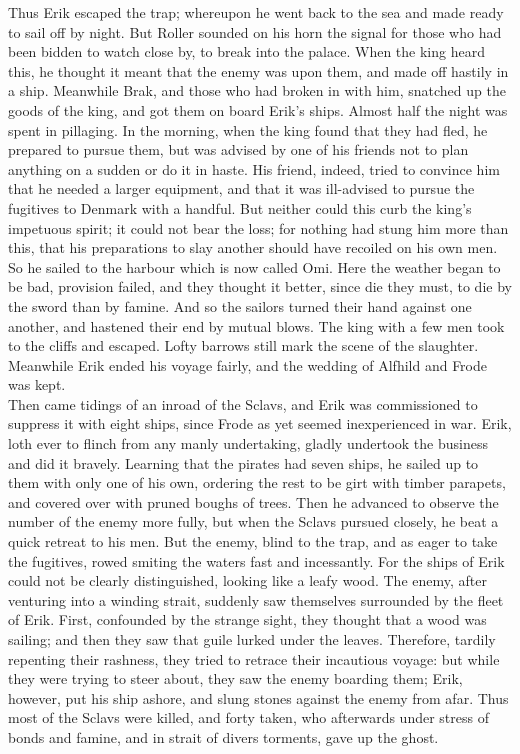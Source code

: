 \documentclass[10pt,a4paper]{report}
\begin{document}
Thus Erik escaped the trap; whereupon he went back to the sea and made ready to sail off by night. But Roller sounded on his horn the signal for those who had been bidden to watch close by, to break into the palace. When the king heard this, he thought it meant that the enemy was upon them, and made off hastily in a ship. Meanwhile Brak, and those who had broken in with him, snatched up the goods of the king, and got them on board Erik's ships. Almost half the night was spent in pillaging. In the morning, when the king found that they had fled, he prepared to pursue them, but was advised by one of his friends not to plan anything on a sudden or do it in haste. His friend, indeed, tried to convince him that he needed a larger equipment, and that it was ill-advised to pursue the fugitives to Denmark with a handful. But neither could this curb the king's impetuous spirit; it could not bear the loss; for nothing had stung him more than this, that his preparations to slay another should have recoiled on his own men. So he sailed to the harbour which is now called Omi. Here the weather began to be bad, provision failed, and they thought it better, since die they must, to die by the sword than by famine. And so the sailors turned their hand against one another, and hastened their end by mutual blows. The king with a few men took to the cliffs and escaped. Lofty barrows still mark the scene of the slaughter. Meanwhile Erik ended his voyage fairly, and the wedding of Alfhild and Frode was kept.\\

Then came tidings of an inroad of the Sclavs, and Erik was commissioned to suppress it with eight ships, since Frode as yet seemed inexperienced in war. Erik, loth ever to flinch from any manly undertaking, gladly undertook the business and did it bravely. Learning that the pirates had seven ships, he sailed up to them with only one of his own, ordering the rest to be girt with timber parapets, and covered over with pruned boughs of trees. Then he advanced to observe the number of the enemy more fully, but when the Sclavs pursued closely, he beat a quick retreat to his men. But the enemy, blind to the trap, and as eager to take the fugitives, rowed smiting the waters fast and incessantly. For the ships of Erik could not be clearly distinguished, looking like a leafy wood. The enemy, after venturing into a winding strait, suddenly saw themselves surrounded by the fleet of Erik. First, confounded by the strange sight, they thought that a wood was sailing; and then they saw that guile lurked under the leaves. Therefore, tardily repenting their rashness, they tried to retrace their incautious voyage: but while they were trying to steer about, they saw the enemy boarding them; Erik, however, put his ship ashore, and slung stones against the enemy from afar. Thus most of the Sclavs were killed, and forty taken, who afterwards under stress of bonds and famine, and in strait of divers torments, gave up the ghost.\\
\end{document}
